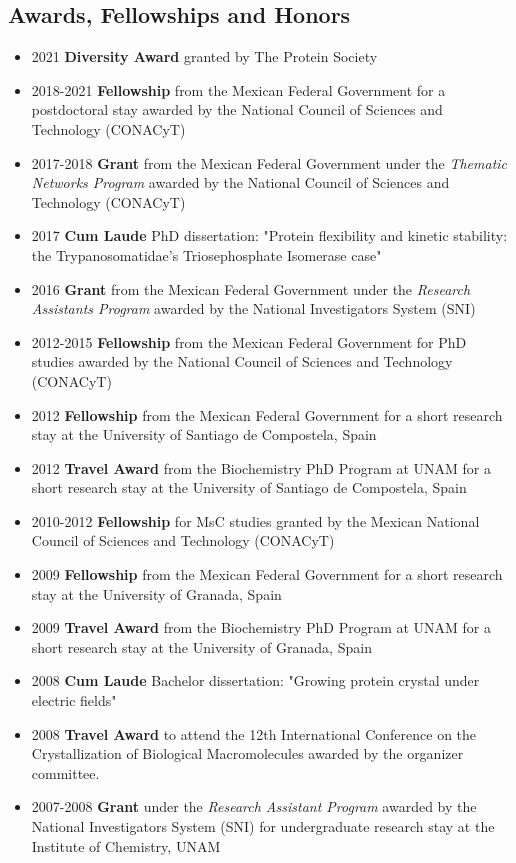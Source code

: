 \documentclass[letterpaper,11pt]{article}
\begin{document}
\subsection*{Awards, Fellowships and Honors}
\begin{itemize}
    \item 2021 \textbf{Diversity Award}
    granted by The Protein Society
    \item 2018-2021 \textbf{Fellowship} from the Mexican Federal Government for a postdoctoral stay awarded by the National Council of Sciences and Technology (CONACyT)
    \item 2017-2018 \textbf{Grant} from the Mexican Federal Government under the \textit{Thematic Networks Program} awarded by the National Council of Sciences and Technology (CONACyT)
    \item 2017 \textbf{Cum Laude} PhD dissertation: "Protein flexibility and kinetic stability: the Trypanosomatidae's Triosephosphate Isomerase case"
 \item 2016 \textbf{Grant} from the Mexican Federal Government under the \textit{Research Assistants Program} awarded by the National Investigators System (SNI)
\item 2012-2015 \textbf{Fellowship} from the Mexican Federal Government for PhD studies awarded by the National Council of Sciences and Technology (CONACyT)
 \item 2012 \textbf{Fellowship} from the Mexican Federal Government for a short research stay at the University of Santiago de Compostela, Spain
 \item 2012 \textbf{Travel Award} from the Biochemistry PhD Program at UNAM for a short research stay at the University of Santiago de Compostela, Spain 
 \item 2010-2012 \textbf{Fellowship} for MsC studies granted by the Mexican National Council of Sciences and Technology (CONACyT)
  \item 2009 \textbf{Fellowship} from the Mexican Federal Government for a short research stay at the University of Granada, Spain
  \item 2009 \textbf{Travel Award} from the Biochemistry PhD Program at UNAM for a short research stay at the University of Granada, Spain 
 \item 2008 \textbf{Cum Laude} Bachelor dissertation: "Growing protein crystal under electric fields"
 \item 2008 \textbf{Travel Award} to attend the 12th International Conference on the Crystallization of Biological Macromolecules awarded by the organizer committee. 
 \item 2007-2008 \textbf{Grant} under the \textit{Research Assistant Program} awarded by the National Investigators System (SNI) for undergraduate research stay at the Institute of Chemistry, UNAM
\end{itemize}
\end{document}
